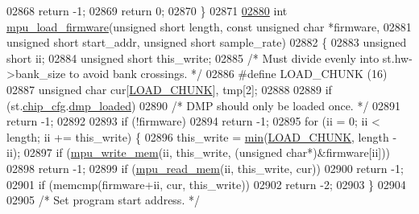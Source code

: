 \begin{DoxyCode}
{{{{{{{{{{{{{{{{{{{{{{{{{{{{{{{{{{02868         \textcolor{keywordflow}{return} -1;
02869     \textcolor{keywordflow}{return} 0;
02870 \}
02871 
\hypertarget{inv__mpu_8c_source.tex_l02880}{}\hyperlink{group___d_r_i_v_e_r_s_ga8fbdfe1a50285d4ab438e29c2efc70f5}{02880} \textcolor{keywordtype}{int} \hyperlink{group___d_r_i_v_e_r_s_ga8fbdfe1a50285d4ab438e29c2efc70f5}{mpu\_load\_firmware}(\textcolor{keywordtype}{unsigned} \textcolor{keywordtype}{short} length, \textcolor{keyword}{const} \textcolor{keywordtype}{unsigned} \textcolor{keywordtype}{char} *firmware,
02881     \textcolor{keywordtype}{unsigned} \textcolor{keywordtype}{short} start\_addr, \textcolor{keywordtype}{unsigned} \textcolor{keywordtype}{short} sample\_rate)
02882 \{
02883     \textcolor{keywordtype}{unsigned} \textcolor{keywordtype}{short} ii;
02884     \textcolor{keywordtype}{unsigned} \textcolor{keywordtype}{short} this\_write;
02885     \textcolor{comment}{/* Must divide evenly into st.hw->bank\_size to avoid bank crossings. */}
02886 \textcolor{preprocessor}{#define LOAD\_CHUNK  (16)}
02887     \textcolor{keywordtype}{unsigned} \textcolor{keywordtype}{char} cur[\hyperlink{inv__mpu_8c_a7750730ae7e5c713b619e347d44185fe}{LOAD\_CHUNK}], tmp[2];
02888 
02889     \textcolor{keywordflow}{if} (st.\hyperlink{structgyro__state__s_ac895217592e2084bd520b0be8e9d20ee}{chip\_cfg}.\hyperlink{structchip__cfg__s_afc32c3e58317c589014257dc9b1ee04b}{dmp\_loaded})
02890         \textcolor{comment}{/* DMP should only be loaded once. */}
02891         \textcolor{keywordflow}{return} -1;
02892 
02893     \textcolor{keywordflow}{if} (!firmware)
02894         \textcolor{keywordflow}{return} -1;
02895     \textcolor{keywordflow}{for} (ii = 0; ii < length; ii += this\_write) \{
02896         this\_write = \hyperlink{group___d_r_i_v_e_r_s_gac6afabdc09a49a433ee19d8a9486056d}{min}(\hyperlink{inv__mpu_8c_a7750730ae7e5c713b619e347d44185fe}{LOAD\_CHUNK}, length - ii);
02897         \textcolor{keywordflow}{if} (\hyperlink{group___d_r_i_v_e_r_s_gafea59910bc3dd30ba3356b1c75213a5f}{mpu\_write\_mem}(ii, this\_write, (\textcolor{keywordtype}{unsigned} \textcolor{keywordtype}{char}*)&firmware[ii]))
02898             \textcolor{keywordflow}{return} -1;
02899         \textcolor{keywordflow}{if} (\hyperlink{group___d_r_i_v_e_r_s_ga3374bececb6743893c9eab27645c1182}{mpu\_read\_mem}(ii, this\_write, cur))
02900             \textcolor{keywordflow}{return} -1;
02901         \textcolor{keywordflow}{if} (memcmp(firmware+ii, cur, this\_write))
02902             \textcolor{keywordflow}{return} -2;
02903     \}
02904 
02905     \textcolor{comment}{/* Set program start address. */}
}}}}}}}}}}}}}}}}}}}}}}}}}}}}}}}}}}
\end{DoxyCode}
